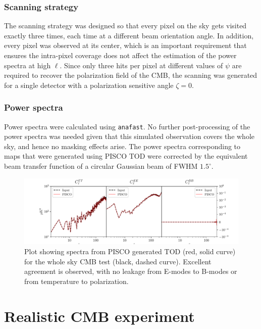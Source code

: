 \documentclass[a4paper,11pt]{article}
\begin{document}
\subsubsection{Scanning strategy}

The scanning strategy was designed so that every pixel on the sky gets visited exactly three times, each time at a different beam orientation angle. In addition, every pixel was observed at its center, which is an important requirement that ensures the intra-pixel coverage does not affect the estimation of the power spectra at high $\ell$. Since only three hits per pixel at different values of $\psi$ are required to recover the polarization field of the CMB, the scanning was generated for a single detector with a polarization sensitive angle $\zeta=0$.

\subsubsection{Power spectra}


Power spectra were calculated using \texttt{anafast}. No further post-processing of the power spectra was needed given that this simulated observation covers the whole sky, and hence no masking effects arise. The power spectra corresponding to maps that were generated using PISCO TOD were corrected by the equivalent beam transfer function of a circular Gaussian beam of FWHM $1.5^\circ$. 

\begin{figure}
	\centering
	\includegraphics[width=1\linewidth]{figures/cmb_r0d00_CLASS_wholeskytest.pdf}
	\caption{Plot showing spectra from PISCO generated TOD (red, solid curve) for the whole sky CMB test (black, dashed curve). Excellent agreement is observed, with no leakage from E-modes to B-modes or from temperature to polarization. }
	\label{fig::pisco4wholesky}
\end{figure}

%
\section{Realistic CMB experiment}
\label{sec::realistic_cmb_experiment}
\end{document}
